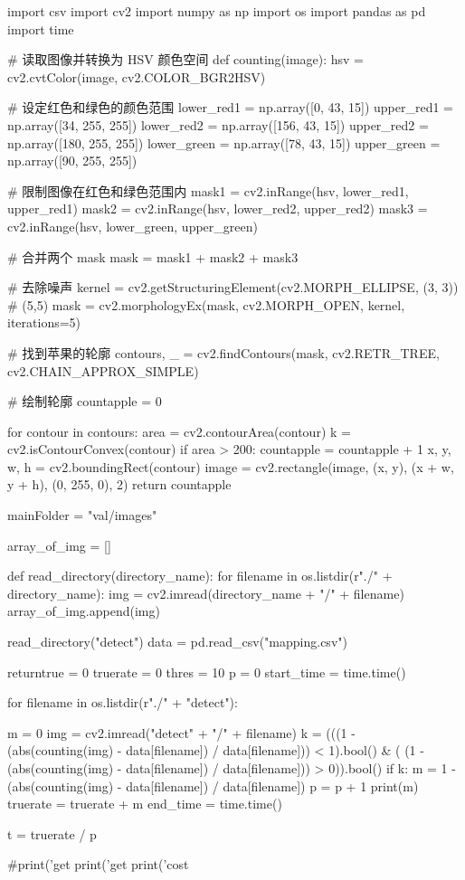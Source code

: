 \begin{python}
import csv
import cv2
import numpy as np
import os
import pandas as pd
import time


# 读取图像并转换为 HSV 颜色空间
def counting(image):
    hsv = cv2.cvtColor(image, cv2.COLOR_BGR2HSV)

    # 设定红色和绿色的颜色范围
    lower_red1 = np.array([0, 43, 15])
    upper_red1 = np.array([34, 255, 255])
    lower_red2 = np.array([156, 43, 15])
    upper_red2 = np.array([180, 255, 255])
    lower_green = np.array([78, 43, 15])
    upper_green = np.array([90, 255, 255])

    # 限制图像在红色和绿色范围内
    mask1 = cv2.inRange(hsv, lower_red1, upper_red1)
    mask2 = cv2.inRange(hsv, lower_red2, upper_red2)
    mask3 = cv2.inRange(hsv, lower_green, upper_green)

    # 合并两个 mask
    mask = mask1 + mask2 + mask3

    # 去除噪声
    kernel = cv2.getStructuringElement(cv2.MORPH_ELLIPSE, (3, 3))  # (5,5)
    mask = cv2.morphologyEx(mask, cv2.MORPH_OPEN, kernel, iterations=5)

    # 找到苹果的轮廓
    contours, _ = cv2.findContours(mask, cv2.RETR_TREE, cv2.CHAIN_APPROX_SIMPLE)

    # 绘制轮廓
    countapple = 0

    for contour in contours:
        area = cv2.contourArea(contour)
        k = cv2.isContourConvex(contour)
        if area > 200:
            countapple = countapple + 1
        x, y, w, h = cv2.boundingRect(contour)
        image = cv2.rectangle(image, (x, y), (x + w, y + h), (0, 255, 0), 2)
    return countapple

mainFolder = "val/images"

array_of_img = []


def read_directory(directory_name):
    for filename in os.listdir(r"./" + directory_name):
        img = cv2.imread(directory_name + "/" + filename)
        array_of_img.append(img)


read_directory("detect")
data = pd.read_csv("mapping.csv")

returntrue = 0
truerate = 0
thres = 10
p = 0
start_time = time.time()

for filename in os.listdir(r"./" + "detect"):

    m = 0
    img = cv2.imread("detect" + "/" + filename)
    k = (((1 - (abs(counting(img) - data[filename]) / data[filename])) < 1).bool() & (
                (1 - (abs(counting(img) - data[filename]) / data[filename])) > 0)).bool()
    if k:
        m = 1 - (abs(counting(img) - data[filename]) / data[filename])
        p = p + 1
        print(m)
        truerate = truerate + m
end_time = time.time()

t = truerate / p

#print('get %
print('get %
print('cost %
\end{python}